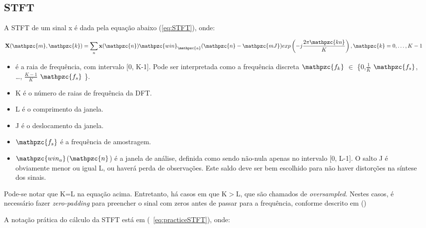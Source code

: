     \subsection{STFT}
        A STFT de um sinal x é dada pela equação abaixo (\ref{eq:STFT}), onde:

    \begin{equation}\label{eq:STFT}
        \mathbf{X}(\mathpzc{m},\mathpzc{k})
        = \sum_{n} \mathbf{x}(\mathpzc{n})
        \mathpzc{win}_\mathpzc{a}(\mathpzc{n} - \mathpzc{mJ})
        exp \left( -j \frac{2\pi\mathpzc{kn}}{K} \right), \mathpzc{k} = 0, \dots, K-1
    \end{equation}


        \begin{itemize}
            
            \item {} é a raia de frequência, com intervalo [0, K-1]. Pode ser interpretada como a frequência discreta $\mathpzc{f_k}$ $\in$ \big\{0,$\frac{1}{K}$ $\mathpzc{f_s}$, \dots, $\frac{K-1}{K}$ $\mathpzc{f_s}$ \big\}.
                        
            \item K é o número de raias de frequência da DFT.
                        
            \item L é o comprimento da janela.
                        
            \item J é o deslocamento da janela.
            
            \item  $\mathpzc{f_s}$ é a frequência de amostragem.
            
            \item $\mathpzc{win_a}$($\mathpzc{n}$) é a janela de análise, definida como sendo não-nula apenas no intervalo [0, L-1]. O salto J é obviamente menor ou igual L, ou haverá perda de observações. Este saldo deve ser bem escolhido para não haver distorções na síntese dos sinais.
        \end{itemize}
    
        Pode-se notar que K=L na equação acima. Entretanto, há casos em que K$>$L, que são chamados de \textit{oversampled}. Nestes casos, é necessário fazer \textit{zero-padding} para preencher o sinal com zeros antes de passar para a frequência, conforme descrito em (\cite{STFT})
        
        A notação prática do cálculo da STFT está em (~\ref{eq:practiceSTFT}), onde:


